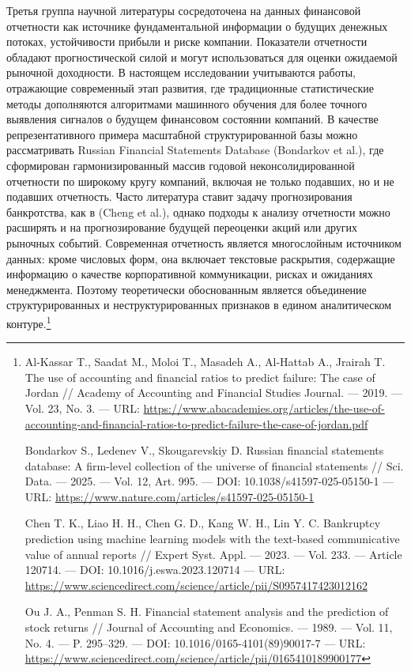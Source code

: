 \documentclass[
]{article}
\begin{document}
Третья группа научной литературы сосредоточена на данных финансовой отчетности как источнике фундаментальной информации о будущих денежных потоках, устойчивости прибыли и риске компании. Показатели отчетности обладают прогностической силой и могут использоваться для оценки ожидаемой рыночной доходности. В настоящем исследовании учитываются работы, отражающие современный этап развития, где традиционные статистические методы дополняются алгоритмами машинного обучения для более точного выявления сигналов о будущем финансовом состоянии компаний. В качестве репрезентативного примера масштабной структурированной базы можно рассматривать Russian Financial Statements Database (Bondarkov et al.), где сформирован гармонизированный массив годовой неконсолидированной отчетности по широкому кругу компаний, включая не только подавших, но и не подавших отчетность. Часто литература ставит задачу прогнозирования банкротства, как в (Cheng et al.), однако подходы к анализу отчетности можно расширять и на прогнозирование будущей переоценки акций или других рыночных событий. Современная отчетность является многослойным источником данных: кроме числовых форм, она включает текстовые раскрытия, содержащие информацию о качестве корпоративной коммуникации, рисках и ожиданиях менеджмента. Поэтому теоретически обоснованным является объединение структурированных и неструктурированных признаков в едином аналитическом контуре.\footnote{Al-Kassar T., Saadat M., Moloi T., Masadeh A., Al-Hattab A., Jrairah T. The use of accounting and financial ratios to predict failure: The case of Jordan // Academy of Accounting and Financial Studies Journal. --- 2019. --- Vol. 23, No. 3. --- URL: \url{https://www.abacademies.org/articles/the-use-of-accounting-and-financial-ratios-to-predict-failure-the-case-of-jordan.pdf}

  Bondarkov S., Ledenev V., Skougarevskiy D. Russian financial statements database: A firm-level collection of the universe of financial statements // Sci. Data. --- 2025. --- Vol. 12, Art. 995. --- DOI: 10.1038/s41597-025-05150-1 --- URL: \url{https://www.nature.com/articles/s41597-025-05150-1}

  Chen T. K., Liao H. H., Chen G. D., Kang W. H., Lin Y. C. Bankruptcy prediction using machine learning models with the text-based communicative value of annual reports // Expert Syst. Appl. --- 2023. --- Vol. 233. --- Article 120714. --- DOI: 10.1016/j.eswa.2023.120714 --- URL: \url{https://www.sciencedirect.com/science/article/pii/S0957417423012162}

  Ou J. A., Penman S. H. Financial statement analysis and the prediction of stock returns // Journal of Accounting and Economics. --- 1989. --- Vol. 11, No. 4. --- P. 295--329. --- DOI: 10.1016/0165-4101(89)90017-7 --- URL: \url{https://www.sciencedirect.com/science/article/pii/0165410189900177}

}
\end{document}
